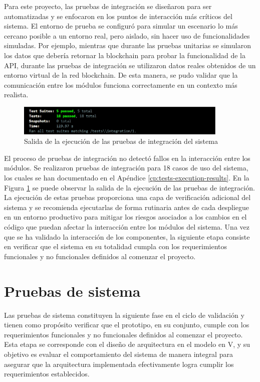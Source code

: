 Para este proyecto, las pruebas de integración se diseñaron para ser automatizadas y se enfocaron en los puntos de interacción más críticos del sistema. El entorno de prueba se configuró para simular un escenario lo más cercano posible a un entorno real, pero aislado, sin hacer uso de funcionalidades simuladas. Por ejemplo, mientras que durante las pruebas unitarias se simularon los datos que debería retornar la blockchain para probar la funcionalidad de la API, durante las pruebas de integración se utilizaron datos reales obtenidos de un entorno virtual de la red blockchain. De esta manera, se pudo validar que la comunicación entre los módulos funciona correctamente en un contexto más realista.

\begin{figure}[!htb]
	\centering
	\includegraphics[width=0.9\textwidth]{Figures/integration-test-results.png}
	\caption{Salida de la ejecución de las pruebas de integración del sistema}
	\label{fig:integration-test-results}
\end{figure}

El proceso de pruebas de integración no detectó fallos en la interacción entre los módulos. Se realizaron pruebas de integración para 18 casos de uso del sistema, los cuales se han documentado en el Apéndice \ref{cp:tests-execution-results}. En la Figura \ref{fig:integration-test-results} se puede observar la salida de la ejecución de las pruebas de integración. La ejecución de estas pruebas proporciona una capa de verificación adicional del sistema y se recomienda ejecutarlas de forma rutinaria antes de cada despliegue en un entorno productivo para mitigar los riesgos asociados a los cambios en el código que puedan afectar la interacción entre los módulos del sistema. Una vez que se ha validado la interacción de los componentes, la siguiente etapa consiste en verificar que el sistema en su totalidad cumpla con los requerimientos funcionales y no funcionales definidos al comenzar el proyecto.

\section{Pruebas de sistema}
\label{sec:system-testing}

Las pruebas de sistema constituyen la siguiente fase en el ciclo de validación y tienen como propósito verificar que el prototipo, en su conjunto, cumple con los requerimientos funcionales y no funcionales definidos al comenzar el proyecto. Esta etapa se corresponde con el diseño de arquitectura en el modelo en V, y su objetivo es evaluar el comportamiento del sistema de manera integral para asegurar que la arquitectura implementada efectivamente logra cumplir los requerimientos establecidos.

